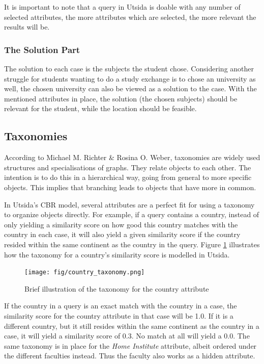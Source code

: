 It is important to note that a query in Utsida is doable with any number of selected attributes, the more attributes which are selected, the more relevant the results will be. 


\subsubsection{The Solution Part}
The solution to each case is the subjects the student chose. Considering another struggle for students wanting to do a study exchange is to chose an university as well, the chosen university can also be viewed as a solution to the case. With the mentioned attributes in place, the solution (the chosen subjects) should be relevant for the student, while the location should be feasible. 

\subsection{Taxonomies}
According to Michael M. Richter & Rosina O. Weber\cite{richter2013case}, taxonomies are widely used structures and specialisations of graphs. They relate
objects to each other. The intention is to do this in a hierarchical way, going from
general to more specific objects. This implies that branching leads to objects that
have more in common. 

In Utsida's CBR model, several attributes are a perfect fit for using a taxonomy to organize objects directly. For example, if a query contains a country, instead of only yielding a similarity score on how good this country matches with the country in each case, it will also yield a given similarity score if the country resided within the same continent as the country in the query. Figure \ref{fig:country_taxonomy} illustrates how the taxonomy for a country's similarity score is modelled in Utsida.

\begin{figure}[H]
    \centering
    \texttt{[image: fig/country\_taxonomy.png]}
    \caption{Brief illustration of the taxonomy for the country attribute}
    \label{fig:country_taxonomy}
\end{figure}

If the country in a query is an exact match with the country in a case, the similarity score for the country attribute in that case will be 1.0. If it is a different country, but it still resides within the same continent as the country in a case, it will yield a similarity score of 0.3. No match at all will yield a 0.0. The same taxonomy is in place for the \emph{Home Institute} attribute, albeit ordered under the different faculties instead. Thus the faculty also works as a hidden attribute.

